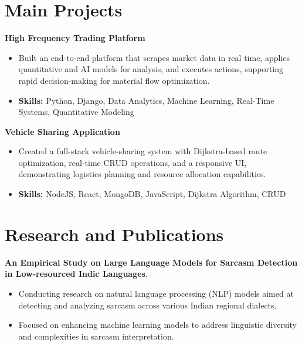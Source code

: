 \documentclass[a4paper,11pt]{article}
\begin{document}
\section{\textbf{Main Projects}}

\vspace{1mm}
  \textbf{High Frequency Trading Platform  }
\vspace{-1.5mm} %
\begin{itemize}
  \item Built an end-to-end platform that scrapes market data in real time, applies quantitative and AI models for analysis, and executes actions, supporting rapid decision-making for material flow optimization.
\vspace{-3mm}
  \item \textbf{Skills:} Python, Django, Data Analytics, Machine Learning, Real-Time Systems, Quantitative Modeling
\end{itemize}


\vspace{1mm}
   \textbf{Vehicle Sharing Application }
\vspace{-1.5mm} %
\begin{itemize}
  \item Created a full-stack vehicle-sharing system with Dijkstra-based route optimization, real-time CRUD operations, and a responsive UI, demonstrating logistics planning and resource allocation capabilities.
\vspace{-3mm}
  \item \textbf{Skills:} NodeJS, React, MongoDB, JavaScript, Dijkstra Algorithm, CRUD
\end{itemize}



\section{\textbf{Research and Publications} \hfill }
\vspace{1mm}
  \textbf{An Empirical Study on Large Language Models for Sarcasm Detection in Low-resourced Indic Languages}.
\vspace{-1mm} %
\begin{itemize}
  \item Conducting research on natural language processing (NLP) models aimed at detecting and analyzing sarcasm across various Indian regional dialects.
\vspace{-3mm}
  \item Focused on enhancing machine learning models to address linguistic diversity and complexities in sarcasm interpretation.
\end{itemize}
\end{document}
